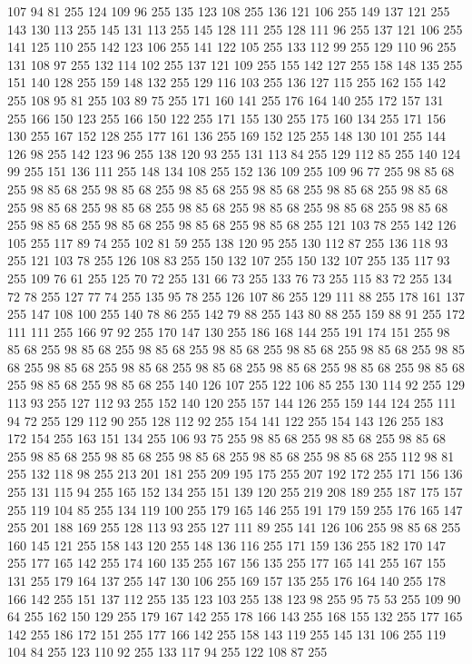 107 94 81 255 124 109 96 255 135 123 108 255 136 121 106 255 149 137 121 255 143 130 113 255 145 131 113 255 145 128 111 255 128 111 96 255 137 121 106 255 141 125 110 255 142 123 106 255 141 122 105 255 133 112 99 255 129 110 96 255 131 108 97 255 132 114 102 255 137 121 109 255 155 142 127 255 158 148 135 255 151 140 128 255 159 148 132 255 129 116 103 255 136 127 115 255 162 155 142 255 108 95 81 255 103 89 75 255 171 160 141 255 176 164 140 255 172 157 131 255 166 150 123 255 166 150 122 255 171 155 130 255 175 160 134 255 171 156 130 255 167 152 128 255 177 161 136 255 169 152 125 255 148 130 101 255 144 126 98 255 142 123 96 255 138 120 93 255 131 113 84 255 129 112 85 255 140 124 99 255 151 136 111 255 148 134 108 255 152 136 109 255 109 96 77 255 98 85 68 255 98 85 68 255 98 85 68 255 98 85 68 255 98 85 68 255 98 85 68 255 98 85 68 255 98 85 68 255 98 85 68 255 98 85 68 255 98 85 68 255 98 85 68 255 98 85 68 255 98 85 68 255 98 85 68 255
98 85 68 255 98 85 68 255 121 103 78 255 142 126 105 255 117 89 74 255 102 81 59 255 138 120 95 255 130 112 87 255 136 118 93 255 121 103 78 255 126 108 83 255 150 132 107 255 150 132 107 255 135 117 93 255 109 76 61 255 125 70 72 255 131 66 73 255 133 76 73 255 115 83 72 255 134 72 78 255 127 77 74 255 135 95 78 255 126 107 86 255 129 111 88 255 178 161 137 255 147 108 100 255 140 78 86 255 142 79 88 255 143 80 88 255 159 88 91 255 172 111 111 255 166 97 92 255 170 147 130 255 186 168 144 255 191 174 151 255 98 85 68 255 98 85 68 255 98 85 68 255 98 85 68 255 98 85 68 255 98 85 68 255 98 85 68 255 98 85 68 255 98 85 68 255 98 85 68 255 98 85 68 255 98 85 68 255 98 85 68 255 98 85 68 255 98 85 68 255 140 126 107 255 122 106 85 255 130 114 92 255 129 113 93 255 127 112 93 255 152 140 120 255 157 144 126 255 159 144 124 255 111 94 72 255 129 112 90 255 128 112 92 255 154 141 122 255 154 143 126 255 183 172 154 255
163 151 134 255 106 93 75 255 98 85 68 255 98 85 68 255 98 85 68 255 98 85 68 255 98 85 68 255 98 85 68 255 98 85 68 255 98 85 68 255 112 98 81 255 132 118 98 255 213 201 181 255 209 195 175 255 207 192 172 255 171 156 136 255 131 115 94 255 165 152 134 255 151 139 120 255 219 208 189 255 187 175 157 255 119 104 85 255 134 119 100 255 179 165 146 255 191 179 159 255 176 165 147 255 201 188 169 255 128 113 93 255 127 111 89 255 141 126 106 255 98 85 68 255 160 145 121 255 158 143 120 255 148 136 116 255 171 159 136 255 182 170 147 255 177 165 142 255 174 160 135 255 167 156 135 255 177 165 141 255 167 155 131 255 179 164 137 255 147 130 106 255 169 157 135 255 176 164 140 255 178 166 142 255 151 137 112 255 135 123 103 255 138 123 98 255 95 75 53 255 109 90 64 255 162 150 129 255 179 167 142 255 178 166 143 255 168 155 132 255 177 165 142 255 186 172 151 255 177 166 142 255 158 143 119 255 145 131 106 255 119 104 84 255 123 110 92 255 133 117 94 255 122 108 87 255
